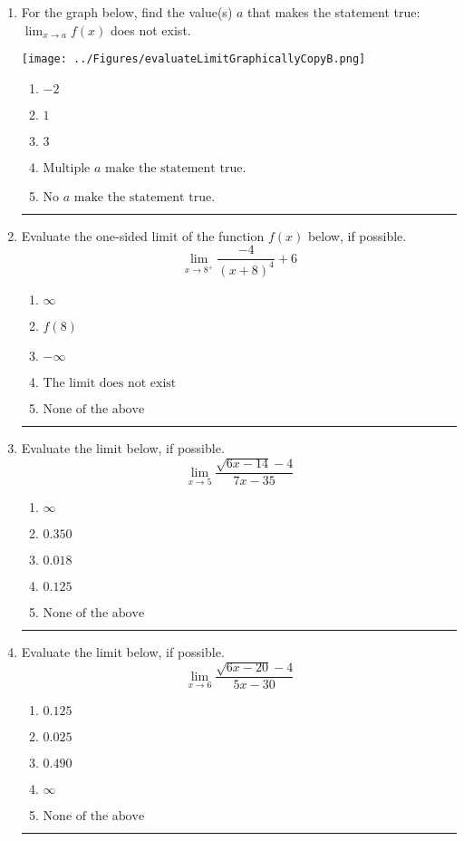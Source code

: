 \documentclass[14pt]{extbook}
\newcommand{\litem}[1]{\item#1\hspace*{-1cm}\rule{\textwidth}{0.4pt}}
\begin{document}
\begin{enumerate}
\litem{
For the graph below, find the value(s) $a$ that makes the statement true: $ \displaystyle \lim_{x \rightarrow a} f(x)$ does not exist.
\begin{center}
    \texttt{[image: ../Figures/evaluateLimitGraphicallyCopyB.png]}
\end{center}
\begin{enumerate}[label=\Alph*.]
\item \( -2 \)
\item \( 1 \)
\item \( 3 \)
\item \( \text{Multiple } a \text{ make the statement true}. \)
\item \( \text{No } a \text{ make the statement true}. \)

\end{enumerate} }
\litem{
Evaluate the one-sided limit of the function $f(x)$ below, if possible.\[ \lim_{x \rightarrow 8^+} \frac{-4}{(x+8)^4}+6 \]\begin{enumerate}[label=\Alph*.]
\item \( \infty \)
\item \( f(8) \)
\item \( -\infty \)
\item \( \text{The limit does not exist} \)
\item \( \text{None of the above} \)

\end{enumerate} }
\litem{
Evaluate the limit below, if possible.\[ \lim_{x \rightarrow 5} \frac{\sqrt{6x - 14} - 4}{7x - 35} \]\begin{enumerate}[label=\Alph*.]
\item \( \infty \)
\item \( 0.350 \)
\item \( 0.018 \)
\item \( 0.125 \)
\item \( \text{None of the above} \)

\end{enumerate} }
\litem{
Evaluate the limit below, if possible.\[ \lim_{x \rightarrow 6} \frac{\sqrt{6x - 20} - 4}{5x - 30} \]\begin{enumerate}[label=\Alph*.]
\item \( 0.125 \)
\item \( 0.025 \)
\item \( 0.490 \)
\item \( \infty \)
\item \( \text{None of the above} \)


\end{enumerate}}
\end{enumerate}
\end{document}
